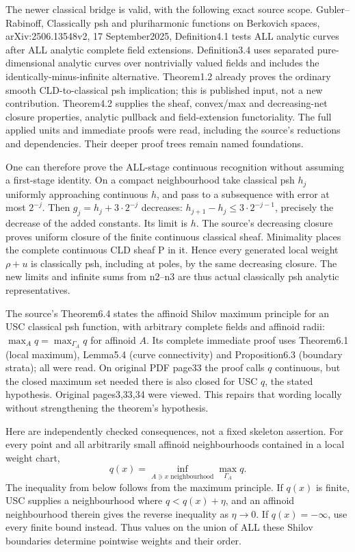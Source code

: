 \documentclass[11pt]{article}
\begin{document}
The newer classical bridge is valid, with the following exact source scope. Gubler--Rabinoff, Classically psh and pluriharmonic functions on Berkovich spaces, arXiv:2506.13548v2, 17 September2025, Definition4.1 tests ALL analytic curves after ALL analytic complete field extensions. Definition3.4 uses separated pure-dimensional analytic curves over nontrivially valued fields and includes the identically-minus-infinite alternative. Theorem1.2 already proves the ordinary smooth CLD-to-classical psh implication; this is published input, not a new contribution. Theorem4.2 supplies the sheaf, convex/max and decreasing-net closure properties, analytic pullback and field-extension functoriality. The full applied units and immediate proofs were read, including the source's reductions and dependencies. Their deeper proof trees remain named foundations.

One can therefore prove the ALL-stage continuous recognition without assuming a first-stage identity. On a compact neighbourhood take classical psh $h_j$ uniformly approaching continuous $h$, and pass to a subsequence with error at most $2^{-j}$. Then $g_j=h_j+3\cdot2^{-j}$ decreases: $h_{j+1}-h_j\leq 3\cdot2^{-j-1}$, precisely the decrease of the added constants. Its limit is $h$. The source's decreasing closure proves uniform closure of the finite continuous classical sheaf. Minimality places the complete continuous CLD sheaf P in it. Hence every generated local weight $\rho+u$ is classically psh, including at poles, by the same decreasing closure. The new limits and infinite sums from n2--n3 are thus actual classically psh analytic representatives.

The source's Theorem6.4 states the affinoid Shilov maximum principle for an USC classical psh function, with arbitrary complete fields and affinoid radii: $\max_A q=\max_{\Gamma_A}q$ for affinoid $A$. Its complete immediate proof uses Theorem6.1 (local maximum), Lemma5.4 (curve connectivity) and Proposition6.3 (boundary strata); all were read. On original PDF page33 the proof calls $q$ continuous, but the closed maximum set needed there is also closed for USC $q$, the stated hypothesis. Original pages3,33,34 were viewed. This repairs that wording locally without strengthening the theorem's hypothesis.

Here are independently checked consequences, not a fixed skeleton assertion. For every point and all arbitrarily small affinoid neighbourhoods contained in a local weight chart,
\[
 q(x)=\inf_{A\ni x\text{ neighbourhood}}\max_{\Gamma_A}q.
\]
The inequality from below follows from the maximum principle. If $q(x)$ is finite, USC supplies a neighbourhood where $q<q(x)+\eta$, and an affinoid neighbourhood therein gives the reverse inequality as $\eta\to0$. If $q(x)=-\infty$, use every finite bound instead. Thus values on the union of ALL these Shilov boundaries determine pointwise weights and their order.
\end{document}
